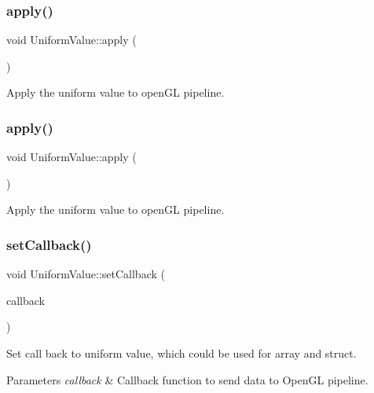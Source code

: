 \subsubsection{\texorpdfstring{apply()}{apply()}\hspace{0.1cm}{\footnotesize\ttfamily [1/2]}}
{\footnotesize\ttfamily void Uniform\+Value\+::apply (\begin{DoxyParamCaption}{ }\end{DoxyParamCaption})}

Apply the uniform value to open\+GL pipeline. \mbox{\label{classUniformValue_a2e29cd1f5bd246b2296cb40a60c3adca}} 
\subsubsection{\texorpdfstring{apply()}{apply()}\hspace{0.1cm}{\footnotesize\ttfamily [2/2]}}
{\footnotesize\ttfamily void Uniform\+Value\+::apply (\begin{DoxyParamCaption}{ }\end{DoxyParamCaption})}

Apply the uniform value to open\+GL pipeline. \mbox{\label{classUniformValue_a3f66bee36e75da9d276b0f99bd137670}} 
\subsubsection{\texorpdfstring{set\+Callback()}{setCallback()}\hspace{0.1cm}{\footnotesize\ttfamily [1/2]}}
{\footnotesize\ttfamily void Uniform\+Value\+::set\+Callback (\begin{DoxyParamCaption}\item[{const std\+::function$<$ void(\hyperlink{classGLProgram}{G\+L\+Program} $\ast$, \hyperlink{structUniform}{Uniform} $\ast$)$>$ \&}]{callback }\end{DoxyParamCaption})}

Set call back to uniform value, which could be used for array and struct. 
\begin{DoxyParams}{Parameters}
{\em callback} & Callback function to send data to Open\+GL pipeline. \\
\hline
\end{DoxyParams}
\mbox{\label{classUniformValue_a3f66bee36e75da9d276b0f99bd137670}} 
